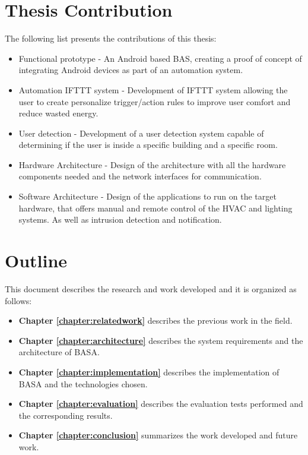 \section{Thesis Contribution}
\label{section:contribution}

The following list presents the contributions of this thesis:

\begin{itemize}
	\item Functional prototype - An Android based \ac{BAS}, creating a 	proof of concept of integrating Android devices as part of an automation system.

	\item Automation \ac{IFTTT} system - Development of \ac{IFTTT} system allowing the user to create personalize trigger/action rules to improve user comfort and reduce wasted energy.
	
	\item User detection - Development of a user detection system capable of determining if the user is inside a specific building and a specific room. 

    \item Hardware Architecture - Design of the architecture with all the hardware components needed and the network interfaces for communication.
    
    \item Software Architecture - Design of the applications to run on the target hardware, that offers manual and remote control of the \ac{HVAC} and lighting systems. As well as intrusion detection and notification.
%    
    
\end{itemize}

\section{Outline}
This document describes the research and work developed and it is organized as follows:

\begin{itemize}

\item \textbf{Chapter \ref{chapter:relatedwork}} describes the previous work in the field.
\item \textbf{Chapter \ref{chapter:architecture}} describes the system requirements and the architecture of BASA.
\item \textbf{Chapter \ref{chapter:implementation}} describes the implementation of BASA and the technologies chosen.
\item \textbf{Chapter \ref{chapter:evaluation}} describes the evaluation tests performed and the corresponding results.
\item \textbf{Chapter \ref{chapter:conclusion}} summarizes the work developed and future work.
\end{itemize}

\cleardoublepage
